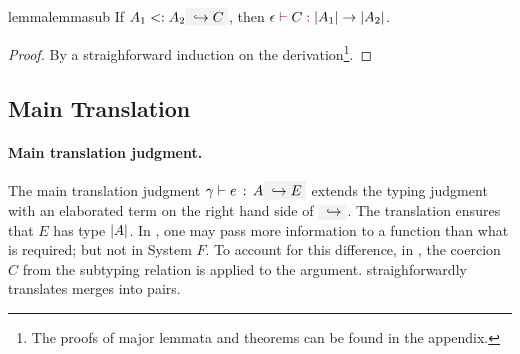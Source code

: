 \begin{restatable}{lemma}{lemmasub}
  \label{lemma:sub}
  If $ A_1 \subtype A_2 \yields C $, then $ \judgeTarget \epsilon C {\im {A_1} \to \im {A_2}} $.
\end{restatable}

\begin{proof}
  By a straighforward induction on the derivation\footnote{The proofs of major lemmata and theorems can be found in the appendix.}.
\end{proof}

\subsection{Main Translation}

\begin{comment}
In this subsection we now present formally the translation rules that convert
\name terms into System $ F $ ones. This set of rules essentially extends
those in the previous section with the light-blue part for the translation.
\end{comment}


\paragraph{Main translation judgment.} The main translation judgment
$\hastype \gamma e A \yields E$ extends the typing judgment with an elaborated
term on the right hand side of $\yields {}$. The translation ensures
that $E$ has type $\lvert A \rvert$. In \name, one may pass more information to a
function than what is required; but not in System $F$. To account for this
difference, in , the coercion $C$ from the subtyping relation is
applied to the argument.  straighforwardly translates merges
into pairs.



